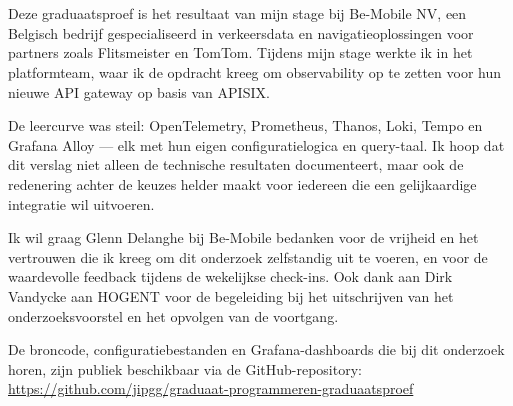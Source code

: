 
\chapter*{}%
\label{ch:voorwoord}

Deze graduaatsproef is het resultaat van mijn stage bij Be-Mobile NV, een Belgisch bedrijf gespecialiseerd in verkeersdata en navigatieoplossingen voor partners zoals Flitsmeister en TomTom. Tijdens mijn stage werkte ik in het platformteam, waar ik de opdracht kreeg om observability op te zetten voor hun nieuwe API gateway op basis van APISIX.

De leercurve was steil: OpenTelemetry, Prometheus, Thanos, Loki, Tempo en Grafana Alloy --- elk met hun eigen configuratielogica en query-taal. Ik hoop dat dit verslag niet alleen de technische resultaten documenteert, maar ook de redenering achter de keuzes helder maakt voor iedereen die een gelijkaardige integratie wil uitvoeren.

Ik wil graag Glenn Delanghe bij Be-Mobile bedanken voor de vrijheid en het vertrouwen die ik kreeg om dit onderzoek zelfstandig uit te voeren, en voor de waardevolle feedback tijdens de wekelijkse check-ins. Ook dank aan Dirk Vandycke aan HOGENT voor de begeleiding bij het uitschrijven van het onderzoeksvoorstel en het opvolgen van de voortgang.

De broncode, configuratiebestanden en Grafana-dashboards die bij dit onderzoek horen, zijn publiek beschikbaar via de GitHub-repository:
\url{https://github.com/jipgg/graduaat-programmeren-graduaatsproef}